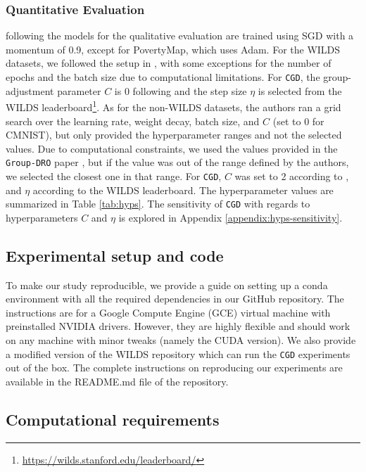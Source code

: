 \subsubsection{Quantitative Evaluation} following \citet{piratla2022focus} the models for the qualitative evaluation are trained using SGD with a momentum of 0.9, except for PovertyMap, which uses Adam. For the WILDS datasets, we followed the setup in \citet{koh2021wilds}, with some exceptions for the number of epochs and the batch size due to computational limitations. For \texttt{CGD}, the group-adjustment parameter $C$ is 0 following \citet{piratla2022focus} and the step size $\eta$ is selected from the WILDS leaderboard\footnote{\url{https://wilds.stanford.edu/leaderboard/}}. As for the non-WILDS datasets, the authors ran a grid search over the learning rate, weight decay, batch size, and $C$ (set to 0 for CMNIST), but only provided the hyperparameter ranges and not the selected values. Due to computational constraints, we used the values provided in the \texttt{Group-DRO} paper \cite{sagawa2020distributionally}, but if the value was out of the range defined by the authors, we selected the closest one in that range. For \texttt{CGD}, $C$ was set to 2 according to \citet{sagawa2020distributionally}, and $\eta$ according to the WILDS leaderboard. The hyperparameter values are summarized in Table \ref{tab:hyps}. The sensitivity of \texttt{CGD} with regards to hyperparameters $C$ and $\eta$ is explored in Appendix \ref{appendix:hyps-sensitivity}.

\subsection{Experimental setup and code}

To make our study reproducible, we provide a guide on setting up a conda environment with all the required dependencies in our GitHub repository. The instructions are for a Google Compute Engine (GCE) virtual machine with preinstalled NVIDIA drivers. However, they are highly flexible and should work on any machine with minor tweaks (namely the CUDA version). We also provide a modified version of the WILDS repository which can run the \texttt{CGD} experiments out of the box. The complete instructions on reproducing our experiments are available in the README.md file of the repository.


\subsection{Computational requirements}

